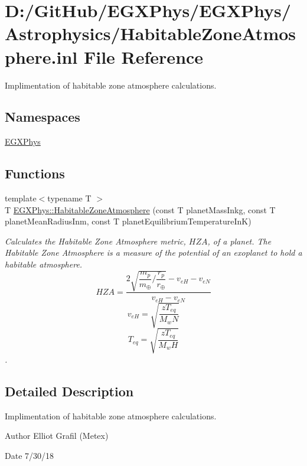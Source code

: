 \hypertarget{_habitable_zone_atmosphere_8inl}{}\section{D\+:/\+Git\+Hub/\+E\+G\+X\+Phys/\+E\+G\+X\+Phys/\+Astrophysics/\+Habitable\+Zone\+Atmosphere.inl File Reference}
\label{_habitable_zone_atmosphere_8inl}


Implimentation of habitable zone atmosphere calculations.  


\subsection*{Namespaces}
\begin{DoxyCompactItemize}
\item 
 \mbox{\hyperlink{namespace_e_g_x_phys}{E\+G\+X\+Phys}}
\end{DoxyCompactItemize}
\subsection*{Functions}
\begin{DoxyCompactItemize}
\item 
{\footnotesize template$<$typename T $>$ }\\T \mbox{\hyperlink{group___e_g_x_phys-_astrophysics-_habitable_zone_atmosphere_ga8cbf49b9a19cfe7a430f1528bb603950}{E\+G\+X\+Phys\+::\+Habitable\+Zone\+Atmosphere}} (const T planet\+Mass\+Inkg, const T planet\+Mean\+Radius\+Inm, const T planet\+Equilibrium\+Temperature\+InK)
\begin{DoxyCompactList}\small\item\em Calculates the Habitable Zone Atmosphere metric, $HZA$, of a planet. The Habitable Zone Atmosphere is a measure of the potential of an exoplanet to hold a habitable atmosphere. \[ HZA= \dfrac{ 2\sqrt{ \dfrac{m_p}{m_{\oplus}} / \dfrac{r_p}{r_{\oplus}} } -v_{eH} - v_{eN} }{v_{eH} - v_{eN}} \] \[ v_{eH}=\sqrt{ \dfrac{z T_{eq}}{ M_wN } } \] \[ T_{eq}=\sqrt{ \dfrac{z T_{eq}}{ M_wH } } \]. \end{DoxyCompactList}\end{DoxyCompactItemize}


\subsection{Detailed Description}
Implimentation of habitable zone atmosphere calculations. 

\begin{DoxyAuthor}{Author}
Elliot Grafil (Metex) 
\end{DoxyAuthor}
\begin{DoxyDate}{Date}
7/30/18 
\end{DoxyDate}
